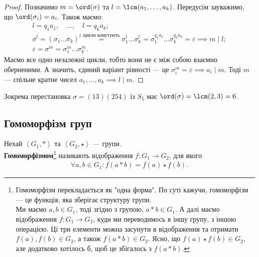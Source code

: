 \documentclass{math_library}
\begin{document}
\begin{proof}
Позначимо $m = \ord(\sigma)$ та $l = \lcm(a_1,\dots,a_k)$. Передусім зауважимо, що $\ord(\sigma_i) = a_i$. Також маємо:
\begin{align*}
l = q_1a_1, \quad \dots, \quad l = q_ka_k; \\
\sigma^l = (\sigma_1 \dots \sigma_k)^l\overset{\text{цикли комутують}}{=} \sigma_1^l \dots \sigma_k^l = \sigma_1^{q_1 a_1} \dots \sigma_k^{q_k a_k} = \varepsilon \implies m \mid l; \\
\varepsilon = \sigma^m = \sigma_1^m \dots \sigma_k^m.
\end{align*}
Маємо все одно незалежні цикли, тобто вони не є між собою взаємно оберненими. А значить, єдиний варіант рівності --- це $\sigma_i^m = \varepsilon \implies a_i \mid m$. Тоді $m$ --- спільне кратне чисел $a_1,\dots,a_k \implies l \mid m$.
\end{proof}

\begin{example}
Зокрема перестановка $\sigma = (13) (254)$ із $S_5$ має $\ord(\sigma) = \lcm(2,3) = 6$.
\end{example}

\subsection{Гомоморфізм груп}
\begin{definition}
Нехай $\left<G_1, * \right>$ та $\left<G_2, \star \right>$ --- групи.\\
\textbf{Гомоморфізмом}\footnote{Гомоморфізм перекладається як "одна форма". По суті кажучи, гомоморфізм --- це функція, яка зберігає структуру групи.\\
Ми маємо $a,b \in G_1$, тоді згідно з групою, $a*b \in G_1$. А далі маємо відображення $f \colon G_1 \to G_2$, куди ми переводимось в іншу групу, з іншою операцією. Ці три елементи можна засунути в відображення та отримати $f(a), f(b) \in G_2$, а також $f(a*b) \in G_2$. Ясно, що $f(a) \star f(b) \in G_2$, але додатково хотілось б, щоб це збігалось з $f(a*b)$.} називають відображення $f \colon G_1 \to G_2$, для якого
\begin{align*}
\forall a,b \in G_1: f(a*b) = f(a) \star f(b).
\end{align*}
\end{definition}
\end{document}
